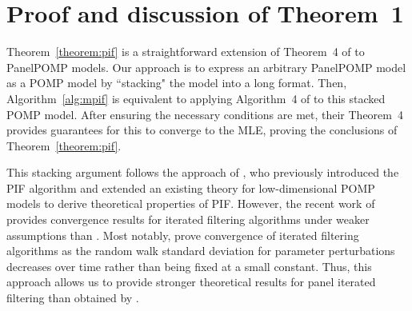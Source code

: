  \section{Proof and discussion of Theorem~1}\label{sec:panelTheory}
 
  Theorem~\ref{theorem:pif} is a straightforward extension of Theorem~4 of \citet{chen24} to PanelPOMP models. 
  Our approach is to express an arbitrary PanelPOMP model as a POMP model by ``stacking" the model into a long format.
  Then, Algorithm~\ref{alg:mpif} is equivalent to applying Algorithm~4 of \citet{chen24} to this stacked POMP model.
  After ensuring the necessary conditions are met, their Theorem~4 provides guarantees for this to converge to the MLE, proving the conclusions of Theorem~\ref{theorem:pif}. 
  
  This stacking argument follows the approach of \citet{breto20}, who previously introduced the PIF algorithm and extended an existing theory for low-dimensional POMP models \citep{ionides15} to derive theoretical properties of PIF. 
  However, the recent work of \citet{chen24} provides convergence results for iterated filtering algorithms under weaker assumptions than \citet{ionides15}.
  Most notably, \citet{chen24} prove convergence of iterated filtering algorithms as the random walk standard deviation for parameter perturbations decreases over time rather than being fixed at a small constant.
  Thus, this approach allows us to provide stronger theoretical results for panel iterated filtering than obtained by \citet{breto20}.
  
